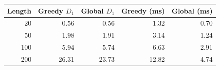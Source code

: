 \begin{tabular}{rrrrr}
\toprule
\textbf{Length} & \textbf{Greedy $D_1$} & \textbf{Global $D_1$} & \textbf{Greedy (ms)} & \textbf{Global (ms)} \\
\midrule
20 & 0.56 & 0.56 & 1.32 & 0.70 \\
50 & 1.98 & 1.91 & 3.14 & 1.24 \\
100 & 5.94 & 5.74 & 6.63 & 2.91 \\
200 & 26.31 & 23.73 & 12.82 & 4.74 \\
\bottomrule
\end{tabular}
